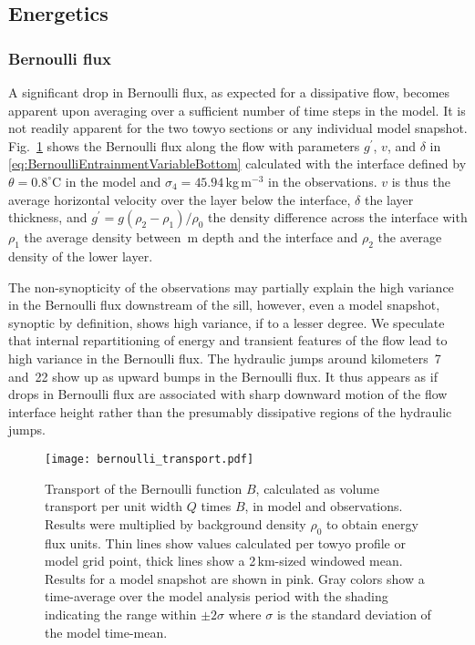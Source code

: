 \documentclass{ametsocV6.1}
\begin{document}
\subsection{Energetics}\label{ssec:EnergyBudgetResults}

\subsubsection{Bernoulli flux}
A significant drop in Bernoulli flux, as expected for a dissipative flow, becomes apparent upon averaging over a sufficient number of time steps in the model.
It is not readily apparent for the two towyo sections or any individual model snapshot.
Fig.~\ref{fig:BernoulliTransport} shows the Bernoulli flux along the flow with parameters $g^\prime$, $v$, and $\delta$ in \eqref{eq:BernoulliEntrainmentVariableBottom} calculated with the interface defined by $\theta=0.8^\circ$C in the model and $\sigma_4=45.94$\,kg\,m$^{-3}$ in the observations.
$v$ is thus the average horizontal velocity over the layer below the interface, $\delta$ the layer thickness, and $g^\prime=g (\rho_2 - \rho_1) / \rho_0$ the density difference across the interface with $\rho_1$ the average density between \TyIntStartDepth\,m depth and the interface and $\rho_2$ the average density of the lower layer.

The non-synopticity of the observations may partially explain the high variance in the Bernoulli flux downstream of the sill, however, even a model snapshot, synoptic by definition, shows high variance, if to a lesser degree.
We speculate that internal repartitioning of energy and transient features of the flow lead to high variance in the Bernoulli flux.
The hydraulic jumps around kilometers~7 and~22 show up as upward bumps in the Bernoulli flux.
It thus appears as if drops in Bernoulli flux are associated with sharp downward motion of the flow interface height rather than the presumably dissipative regions of the hydraulic jumps.

\begin{figure}
\centerline{\texttt{[image: bernoulli\_transport.pdf]}}
\caption{Transport of the Bernoulli function $B$, calculated as volume transport per unit width $Q$ times $B$, in model and observations.
Results were multiplied by background density $\rho_0$ to obtain energy flux units.
Thin lines show values calculated per towyo profile or model grid point, thick lines show a 2\,km-sized windowed mean.
Results for a model snapshot are shown in pink.
Gray colors show a time-average over the model analysis period with the shading indicating the range within $\pm 2 \sigma$ where $\sigma$ is the standard deviation of the model time-mean.}
\label{fig:BernoulliTransport}
\end{figure}
\end{document}
